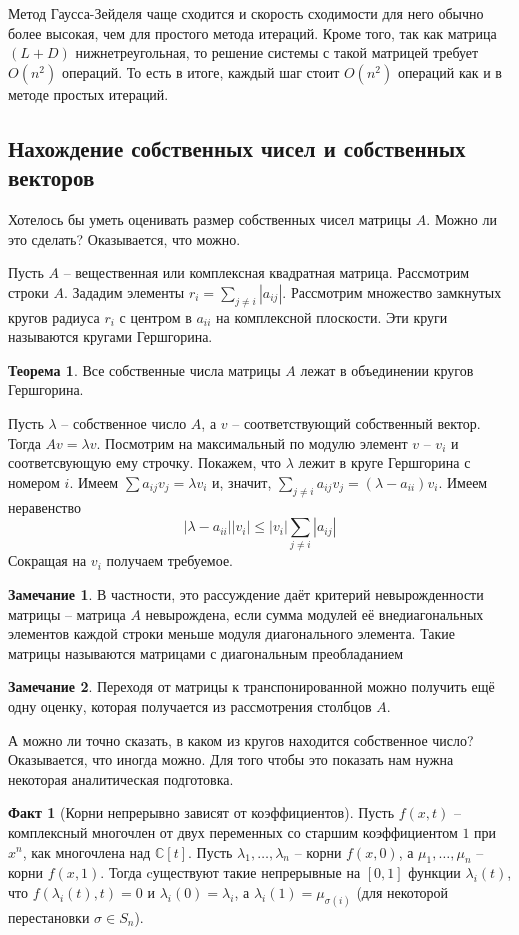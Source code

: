 \documentclass[10pt,a4paper,oneside]{book}
\theoremstyle{definition}
\newtheorem*{rem}{\color{green!50!blue}Замечание}
\newtheorem*{fact}{Факт}
\newtheorem{thm}{\color{red!40!black}Теорема}
\renewcommand{\leq}{\leqslant}
\newcommand{\mb}[1]{\mathbb{#1}}
\def\thrm{\begin{thm}}
\def\ethrm{\end{thm}}
\def\rm{\begin{rem}}
\def\erm{\end{rem}}
\def\fct{\begin{fact}}
\def\efct{\end{fact}}
\begin{document}
Метод Гаусса-Зейделя чаще сходится и скорость сходимости для него обычно более высокая, чем для простого метода итераций. Кроме того, так как матрица $(L+D)$ нижнетреугольная, то решение системы с такой матрицей требует $O(n^2)$ операций. То есть в итоге, каждый шаг стоит $O(n^2)$ операций как и в методе простых итераций.







\subsection{Нахождение собственных чисел и собственных векторов}

Хотелось бы уметь оценивать размер собственных чисел матрицы $A$. Можно ли это сделать? Оказывается, что можно. 


Пусть $A$ -- вещественная или комплексная квадратная матрица. Рассмотрим строки $A$. Зададим элементы $r_i=\sum_{j\neq i} |a_{ij}|$. Рассмотрим множество замкнутых кругов радиуса $r_i$ с центром в $a_{ii}$ на комплексной плоскости. Эти круги называются кругами Гершгорина. 

\thrm Все собственные числа матрицы $A$ лежат в объединении кругов Гершгорина. 
\ethrm
\proof Пусть $\lambda$ -- собственное число $A$, а $v$ -- соответствующий собственный вектор. Тогда $Av=\lambda v$. Посмотрим на максимальный по модулю элемент $v$ -- $v_i$ и соответсвующую ему строчку. Покажем, что $\lambda$ лежит в круге Гершгорина с номером $i$. Имеем $\sum a_{ij}v_j =\lambda v_i$  и, значит, $\sum_{j\neq i} a_{ij}v_j= (\lambda - a_{ii})v_i $. Имеем неравенство $$|\lambda -a_{ii}||v_i| \leq |v_i|\sum_{j\neq i} |a_{ij}|$$
Сокращая на $v_i$ получаем требуемое. 
\endproof

\rm В частности, это рассуждение даёт критерий невырожденности матрицы -- матрица $A$ невырождена, если сумма модулей её внедиагональных элементов каждой строки меньше модуля диагонального элемента. Такие матрицы называются матрицами с диагональным преобладанием
\erm

\rm
Переходя от матрицы к транспонированной можно получить ещё одну оценку, которая получается из рассмотрения столбцов $A$.
\erm

А можно ли точно сказать, в каком из кругов находится собственное число? Оказывается, что иногда можно. Для того чтобы это показать нам нужна некоторая аналитическая подготовка.

\fct[Корни непрерывно зависят от коэффициентов] Пусть $f(x,t)$ -- комплексный многочлен от двух переменных со старшим коэффициентом $1$ при $x^n$, как многочлена над $\mb C[t]$. Пусть $\lambda_1,\dots,\lambda_n$ -- корни $f(x,0)$, а $\mu_1,\dots, \mu_n$ -- корни $f(x,1)$. Тогда cуществуют такие непрерывные на $[0,1]$ функции $\lambda_i(t)$, что $f(\lambda_i(t),t)=0$ и $\lambda_i(0)=\lambda_i$, а $\lambda_i(1)=\mu_{\sigma(i)}$ (для некоторой перестановки $\sigma \in S_n$).
\efct
\end{document}
